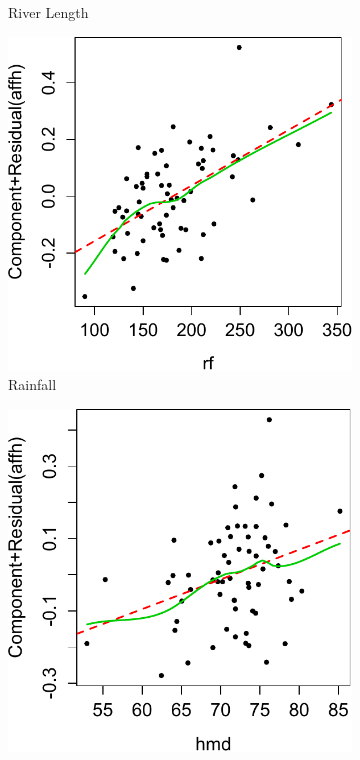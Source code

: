 \documentclass[preprint,review,12pt]{elsarticle}
\begin{document}
\begin{figure}[!htp]
\begin{subfigure}[t]{0.23\textwidth}
\caption{River Length}
\end{subfigure}
\begin{subfigure}[t]{0.23\textwidth}
\centering
\includegraphics[width=\linewidth, keepaspectratio]{rf.pdf}
\caption{Rainfall}
\end{subfigure}
\begin{subfigure}[t]{0.23\textwidth}
\centering
\includegraphics[width=\linewidth, keepaspectratio]{hmd.pdf}

\end{subfigure}
\end{figure}
\end{document}
